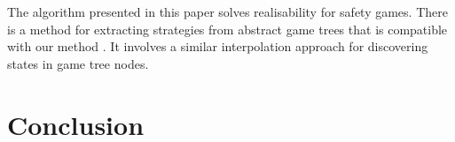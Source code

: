 \documentclass{llncs}
\begin{document}
The algorithm presented in this paper solves realisability for safety games.
There is a method for extracting strategies from abstract game trees that is
compatible with our method \cite{een2015}. It involves a similar interpolation
approach for discovering states in game tree nodes.

\section{Conclusion}




\end{document}

